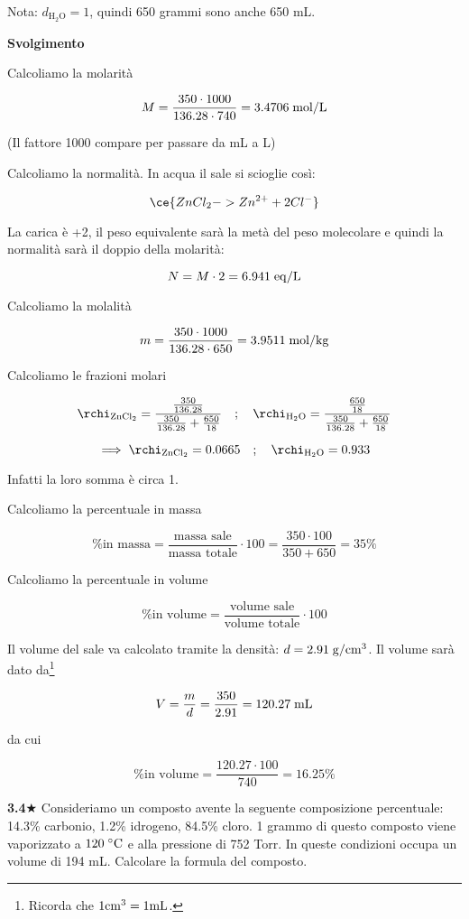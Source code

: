 \vspace{0.2cm}Nota: $d_{\text{H}_2\text{O}}=1$, quindi 650 grammi sono anche 650 mL.

\vspace{0.2cm}\large\textbf{Svolgimento}\normalsize

\vspace{0.2cm}Calcoliamo la molarità

$$M=\frac{350 \cdot 1000}{136.28 \cdot 740}=3.4706 \; \rm mol/L$$

(Il fattore 1000 compare per passare da mL a L)

Calcoliamo la normalità. In acqua il sale si scioglie così:

$$\ce{ZnCl_2 -> Zn^{2+} + 2Cl^-}$$

La carica è +2, il peso equivalente sarà la metà del peso molecolare e quindi la normalità sarà il doppio della molarità:

$$N=M \cdot 2=6.941 \; \rm eq/L$$

Calcoliamo la molalità

$$m=\frac{350 \cdot 1000}{136.28 \cdot 650}=3.9511 \; \rm mol/kg$$

Calcoliamo le frazioni molari

$$\rchi_{\rm ZnCl_2}=\frac{\frac{350}{136.28}}{\frac{350}{136.28} + \frac{650}{18}}
\quad;\quad
\rchi_{\rm H_2O}=\frac{\frac{650}{18}}{\frac{350}{136.28} + \frac{650}{18}}$$

$$\implies
\rchi_{\rm ZnCl_2}=0.0665
\quad;\quad
\rchi_{\rm H_2O}=0.933
$$

Infatti la loro somma è circa 1.

Calcoliamo la percentuale in massa

$$\text{\% in massa}
=\frac{\text{massa sale}}{\text{massa totale}} \cdot 100
=\frac{350 \cdot 100}{350 + 650}=35\%$$

Calcoliamo la percentuale in volume

$$\text{\% in volume}
=\frac{\text{volume sale}}{\text{volume totale}} \cdot 100$$

Il volume del sale va calcolato tramite la densità: $d=2.91 \; \rm g/cm^3$. Il volume sarà dato da\footnote{Ricorda che $\rm 1 cm^3 = 1 mL$.}

$$V=\frac{m}{d}=\frac{350}{2.91}=120.27 \; \rm mL$$

da cui 

$$\text{\% in volume}
=\frac{120.27 \cdot 100}{740}=16.25\%$$

\vspace{0.2cm}\textbf{3.4}$\bigstar$ Consideriamo un composto avente la seguente composizione percentuale: 14.3\% carbonio, 1.2\% idrogeno, 84.5\% cloro. 1 grammo di questo composto viene vaporizzato a $120 \; \rm ^{\circ}C$ e alla pressione di 752 Torr. In queste condizioni occupa un volume di 194 mL. Calcolare la formula del composto.

